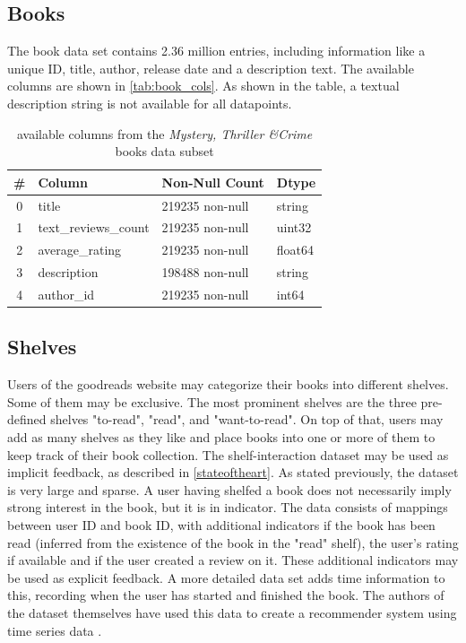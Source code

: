\documentclass[10pt,final,journal,a4paper,oneside,twocolumn]{IEEEtran}
\begin{document}
\subsection{Books}
The book data set contains 2.36 million entries, including information like a unique ID, title, author, release date and a description text. The available columns are shown in \autoref{tab:book_cols}. As shown in the table, a textual description string is not available for all datapoints.
\begin{table}[h]        
    \begin{center}
        \begin{tabular}{clll}
            \toprule
            \# & Column & Non-Null Count & Dtype \\
            \midrule
            0 & title & 219235 non-null & string \\
            1 & text\_reviews\_count & 219235 non-null & uint32 \\
            2 & average\_rating & 219235 non-null & float64 \\
            3 & description & 198488 non-null & string \\
            4 & author\_id & 219235 non-null & int64 \\
            \bottomrule
        \end{tabular}
    \end{center}
\caption{available columns from the \emph{Mystery, Thriller \&Crime} books data subset}
\label{tab:book_cols}
\end{table}
    

\subsection{Shelves}
Users of the goodreads website may categorize their books into different shelves. Some of them may be exclusive. The most prominent shelves are the three pre-defined shelves "to-read", "read", and "want-to-read". On top of that, users may add as many shelves as they like and place books into one or more of them to keep track of their book collection.
The shelf-interaction dataset may be used as implicit feedback, as described in \autoref{stateoftheart}. As stated previously, the dataset is very large and sparse. A user having shelfed a book does not necessarily imply strong interest in the book, but it is in indicator. 
The data consists of mappings between user ID and book ID, with additional indicators if the book has been read (inferred from the existence of the book in the "read" shelf), the user's rating if available and if the user created a review on it. These additional indicators may be used as explicit feedback.
A more detailed data set adds time information to this, recording when the user has started and finished the book. The authors of the dataset themselves have used this data to create a recommender system using time series data \cite{Pera.2018}.
\end{document}
